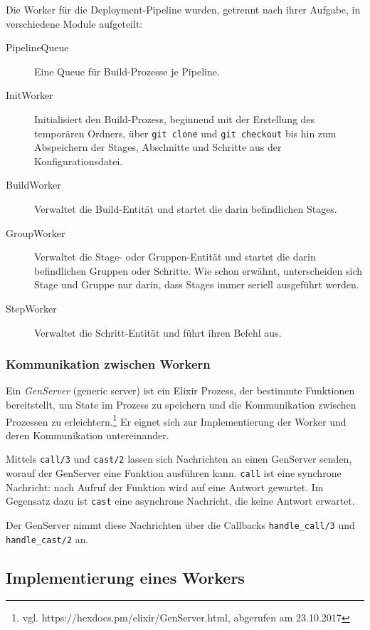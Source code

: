 Die Worker für die Deployment-Pipeline wurden, getrennt nach ihrer Aufgabe, in verschiedene Module aufgeteilt:

\begin{description}
  \item [PipelineQueue] Eine Queue für Build-Prozesse je Pipeline.
  \item [InitWorker] Initialisiert den Build-Prozess, beginnend mit der Erstellung des temporären Ordners, über \texttt{git clone} und \texttt{git checkout} bis hin zum Abspeichern der Stages, Abschnitte und Schritte aus der Konfigurationsdatei.
  \item [BuildWorker] Verwaltet die Build-Entität und startet die darin befindlichen Stages.
  \item [GroupWorker] Verwaltet die Stage- oder Gruppen-Entität und startet die darin befindlichen Gruppen oder Schritte. Wie schon erwähnt, unterscheiden sich Stage und Gruppe nur darin, dass Stages immer seriell ausgeführt werden.
  \item [StepWorker] Verwaltet die Schritt-Entität und führt ihren Befehl aus.
\end{description}

\subsubsection{Kommunikation zwischen Workern}

Ein \emph{GenServer} (generic server) ist ein Elixir Prozess, der bestimmte Funktionen bereitstellt, um State im Prozess zu speichern und die Kommunikation zwischen Prozessen zu erleichtern.\footnote{vgl. https://hexdocs.pm/elixir/GenServer.html, abgerufen am 23.10.2017} Er eignet sich zur Implementierung der Worker und deren Kommunikation untereinander.

Mittels \texttt{call/3} und \texttt{cast/2} lassen sich Nachrichten an einen GenServer senden, worauf der GenServer eine Funktion ausführen kann. \texttt{call} ist eine synchrone Nachricht: nach Aufruf der Funktion wird auf eine Antwort gewartet. Im Gegensatz dazu ist \texttt{cast} eine asynchrone Nachricht, die keine Antwort erwartet.

Der GenServer nimmt diese Nachrichten über die Callbacks \texttt{handle\_\allowbreak call/3} und \texttt{handle\_\allowbreak cast/2} an.

\subsection{Implementierung eines Workers}
\label{subsec:implementierung-worker}


